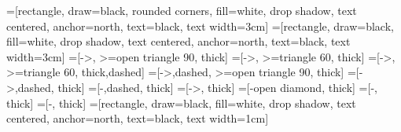 \usetikzlibrary{positioning,shapes,shadows,arrows,calc,shapes.multipart}
=[rectangle, draw=black, rounded corners, fill=white, drop shadow,
text centered, anchor=north, text=black, text width=3cm]
=[rectangle, draw=black, fill=white, drop shadow,
text centered, anchor=north, text=black, text width=3cm]
=[->, >=open triangle 90, thick]
=[->, >=triangle 60, thick]
=[->, >=triangle 60, thick,dashed]
=[->,dashed, >=open triangle 90, thick]
=[->,dashed, thick]
=[-,dashed, thick]
=[->, thick]
=[-open diamond, thick]
=[-, thick]
=[-, thick]
=[rectangle, draw=black, fill=white, drop shadow,
text centered, anchor=north, text=black, text width=1cm]